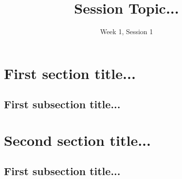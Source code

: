 \documentclass[11pt]{exam}
\title{Session Topic...}
\date{Week 1, Session 1}
\begin{document}
\maketitle

\section{First section title...}
    
    \vspace{10px}
    \subsection{First subsection title...}

\pagebreak
\section{Second section title...}
    
    \vspace{10px}
    \subsection{First subsection title...}
\end{document}
